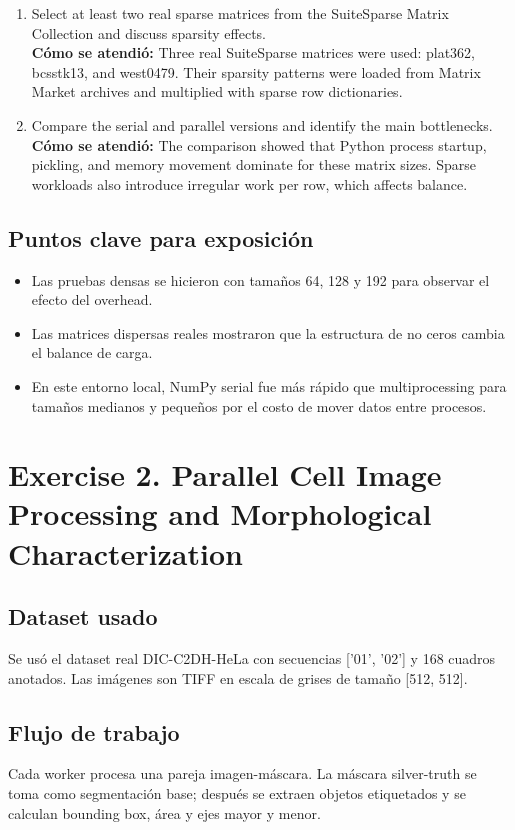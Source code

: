 \documentclass[11pt]{article}
\begin{document}
\begin{enumerate}[leftmargin=*]
\textbf{Cómo se atendió:} Dense experiments were run for sizes 64, 128, and 192 to compare the scaling behavior of the serial and multiprocessing implementations.
\item Select at least two real sparse matrices from the SuiteSparse Matrix Collection and discuss sparsity effects.\\
\textbf{Cómo se atendió:} Three real SuiteSparse matrices were used: plat362, bcsstk13, and west0479. Their sparsity patterns were loaded from Matrix Market archives and multiplied with sparse row dictionaries.
\item Compare the serial and parallel versions and identify the main bottlenecks.\\
\textbf{Cómo se atendió:} The comparison showed that Python process startup, pickling, and memory movement dominate for these matrix sizes. Sparse workloads also introduce irregular work per row, which affects balance.
\end{enumerate}
\subsection*{Puntos clave para exposición}
\begin{itemize}[leftmargin=*]
\item Las pruebas densas se hicieron con tamaños 64, 128 y 192 para observar el efecto del overhead.
\item Las matrices dispersas reales mostraron que la estructura de no ceros cambia el balance de carga.
\item En este entorno local, NumPy serial fue más rápido que multiprocessing para tamaños medianos y pequeños por el costo de mover datos entre procesos.
\end{itemize}
\section*{Exercise 2. Parallel Cell Image Processing and Morphological Characterization}
\subsection*{Dataset usado}
Se usó el dataset real DIC-C2DH-HeLa con secuencias ['01', '02'] y 168 cuadros anotados. Las imágenes son TIFF en escala de grises de tamaño [512, 512].
\subsection*{Flujo de trabajo}
Cada worker procesa una pareja imagen-máscara. La máscara silver-truth se toma como segmentación base; después se extraen objetos etiquetados y se calculan bounding box, área y ejes mayor y menor.
\end{document}
